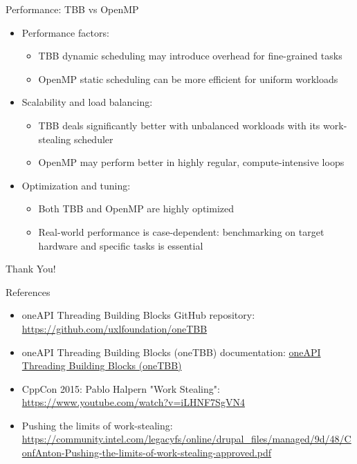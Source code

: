 \documentclass{beamer}
\begin{document}
\begin{frame}{Performance: TBB vs OpenMP}
  \begin{itemize}
    \item Performance factors:
      \begin{itemize}
        \item TBB dynamic scheduling may introduce overhead for fine-grained tasks
        \item OpenMP static scheduling can be more efficient for uniform workloads
      \end{itemize}
    \item Scalability and load balancing:
      \begin{itemize}
        \item TBB deals significantly better with unbalanced workloads with its work-stealing scheduler
        \item OpenMP may perform better in highly regular, compute-intensive loops
      \end{itemize}
    \item Optimization and tuning:
      \begin{itemize}
        \item Both TBB and OpenMP are highly optimized
        \item Real-world performance is case-dependent: benchmarking on target hardware and specific tasks is essential
      \end{itemize}
  \end{itemize}
\end{frame}

\begin{frame}
  \centering
  \Huge{Thank You!}
\end{frame}

\begin{frame}{References}
  \begin{itemize}
    \item oneAPI Threading Building Blocks GitHub repository: \url{https://github.com/uxlfoundation/oneTBB}
    \item oneAPI Threading Building Blocks (oneTBB) documentation: \url{oneAPI Threading Building Blocks (oneTBB)}
    \item CppCon 2015: Pablo Halpern "Work Stealing": \url{https://www.youtube.com/watch?v=iLHNF7SgVN4}
    \item Pushing the limits of work-stealing: \url{https://community.intel.com/legacyfs/online/drupal_files/managed/9d/48/ConfAnton-Pushing-the-limits-of-work-stealing-approved.pdf}
  \end{itemize}
\end{frame}
\end{document}
